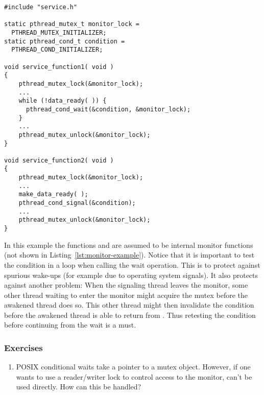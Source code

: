 \begin{lstlisting}[float=tp,frame=single,xleftmargin=0in,
  caption={Monitor Example},label=lst:monitor-example]
#include "service.h"

static pthread_mutex_t monitor_lock =
  PTHREAD_MUTEX_INITIALIZER;
static pthread_cond_t condition =
  PTHREAD_COND_INITIALIZER;

void service_function1( void )
{
    pthread_mutex_lock(&monitor_lock);
    ...
    while (!data_ready( )) {
      pthread_cond_wait(&condition, &monitor_lock);
    }
    ...
    pthread_mutex_unlock(&monitor_lock);
}

void service_function2( void )
{
    pthread_mutex_lock(&monitor_lock);
    ...
    make_data_ready( );
    pthread_cond_signal(&condition);
    ...
    pthread_mutex_unlock(&monitor_lock);
}
\end{lstlisting}

In this example the functions  and  are assumed
to be internal monitor functions (not shown in Listing~\ref{lst:monitor-example}). Notice that
it is important to test the condition in a loop when calling the wait operation. This is to
protect against spurious wake-ups (for example due to operating system signals). It also
protects against another problem: When the signaling thread leaves the monitor, some other
thread waiting to enter the monitor might acquire the mutex before the awakened thread does so.
This other thread might then invalidate the condition before the awakened thread is able to
return from . Thus retesting the condition before continuing from
the wait is a must.

\subsubsection*{Exercises}

\begin{enumerate}

\item POSIX conditional waits take a pointer to a mutex object. However, if one wants to use a
  reader/writer lock to control access to the monitor,  can't be
  used directly. How can this be handled?

\end{enumerate}
